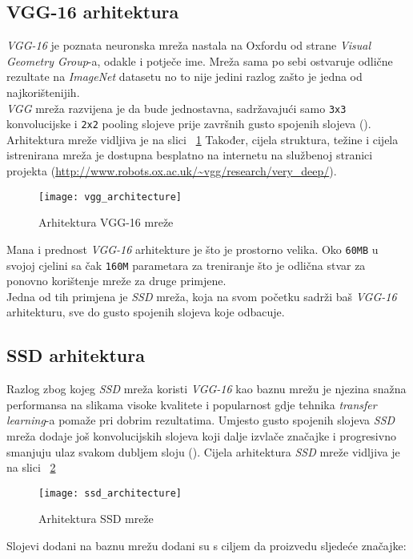 \subsection{VGG-16 arhitektura}
\emph{VGG-16} je poznata neuronska mreža nastala na Oxfordu od strane \emph{Visual Geometry Group}-a, odakle i potječe ime.
Mreža sama po sebi ostvaruje odlične rezultate na \emph{ImageNet} datasetu no to nije jedini razlog zašto je jedna od najkorištenijih. \\
\emph{VGG} mreža razvijena je da bude jednostavna, sadržavajući samo \texttt{3x3} konvolucijske i \texttt{2x2} pooling slojeve prije završnih gusto spojenih slojeva (\cite{simonyan2014very}).
Arhitektura mreže vidljiva je na slici ~\ref{fig:VGGArchitecture}
Također, cijela struktura, težine i cijela istrenirana mreža je dostupna besplatno na internetu na službenoj stranici projekta (\url{http://www.robots.ox.ac.uk/~vgg/research/very_deep/}).
\begin{figure}[h!]
	\centering
	\texttt{[image: vgg\_architecture]}
	 \caption{Arhitektura VGG-16 mreže}
 	 \label{fig:VGGArchitecture}
\end{figure}
Mana i prednost \emph{VGG-16} arhitekture je što je prostorno velika.
Oko \texttt{60MB} u svojoj cjelini sa čak \texttt{160M} parametara za treniranje što je odlična stvar za ponovno korištenje mreže za druge primjene. \\
Jedna od tih primjena je \emph{SSD} mreža, koja na svom početku sadrži baš \emph{VGG-16} arhitekturu, sve do gusto spojenih slojeva koje odbacuje.

\subsection{SSD arhitektura}
Razlog zbog kojeg \emph{SSD} mreža koristi \emph{VGG-16} kao baznu mrežu je njezina snažna performansa na slikama visoke kvalitete i popularnost gdje tehnika \emph{transfer learning}-a pomaže pri dobrim rezultatima.
Umjesto gusto spojenih slojeva \emph{SSD} mreža dodaje još konvolucijskih slojeva koji dalje izvlače značajke i progresivno smanjuju ulaz svakom dubljem sloju (\cite{liu2016ssd}).
Cijela arhitektura \emph{SSD} mreže vidljiva je na slici ~\ref{fig:SSDArchitecture}
\begin{figure}[h!]
	\centering
	\texttt{[image: ssd\_architecture]}
	 \caption{Arhitektura SSD mreže}
 	 \label{fig:SSDArchitecture}
\end{figure}
Slojevi dodani na baznu mrežu dodani su s ciljem da proizvedu sljedeće značajke:
